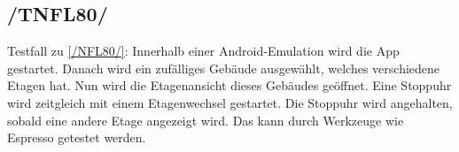 \subsection*{/TNFL80/}

\label{/TNFL80/} Testfall zu \ref{/NFL80/}: Innerhalb einer \Gls{Android}-\Gls{Emulation} wird die App gestartet.
Danach wird ein zufälliges Gebäude ausgewählt, welches verschiedene Etagen hat.
Nun wird die Etagenansicht dieses Gebäudes geöffnet.
Eine Stoppuhr wird zeitgleich mit einem Etagenwechsel gestartet.
Die Stoppuhr wird angehalten, sobald eine andere Etage angezeigt wird.
Das kann durch Werkzeuge wie \Gls{Espresso} getestet werden.